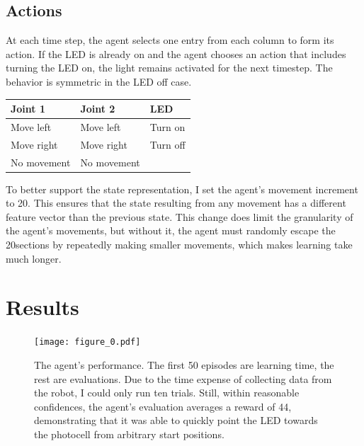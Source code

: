 \documentclass{article}
\begin{document}
\subsection{Actions}

At each time step, the agent selects one entry from each column to form its action. If the LED is already on and the agent chooses an action that includes turning the LED on, the light remains activated for the next timestep. The behavior is symmetric in the LED off case.

\begin{center}
	\begin{tabular}{ l l l}
		Joint 1 & Joint 2 & LED\\ \midrule
		Move left & Move left & Turn on\\
		Move right & Move right & Turn off\\
		No movement & No movement & 
		
	\end{tabular}
\end{center}

To better support the state representation, I set the agent's movement increment to 20\degree. This ensures that the state resulting from any movement has a different feature vector than the previous state. This change does limit the granularity of the agent's movements, but without it, the agent must randomly escape the 20\degree\space sections by repeatedly making smaller movements, which makes learning take much longer. 



\section{Results}


	\begin{figure}[h]
		\begin{center}
			\texttt{[image: figure\_0.pdf]}
			\caption{The agent's performance. The first 50 episodes are learning time, the rest are evaluations. Due to the time expense of collecting data from the robot, I could only run ten trials. Still, within reasonable confidences, the agent's evaluation averages a reward of 44, demonstrating that it was able to quickly point the LED towards the photocell from arbitrary start positions.}
		\end{center}
	\end{figure}
	
\end{document}
